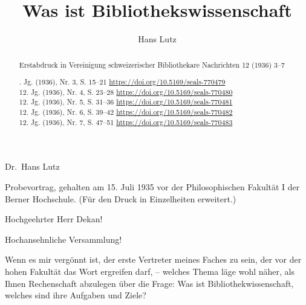 \documentclass[a4paper,
fontsize=11pt,
oneside,
numbers=noperiodatend,
parskip=half-,
bibliography=totoc,
final
]{scrartcl}
\title{\LARGE{Was ist Bibliothekswissenschaft}}%
\author{Hans Lutz} %
\date{}
\begin{document}
\maketitle
\thispagestyle{fancyplain} 

\begin{abstract}
\noindent Erstabdruck in Vereinigung schweizerischer Bibliothekare Nachrichten 12
(1936) 3--7

. Jg. (1936), Nr. 3, S. 15--21
\url{https://doi.org/10.5169/seals-770479}\\
12. Jg. (1936), Nr. 4, S. 23--28
\url{https://doi.org/10.5169/seals-770480}\\
12. Jg. (1936), Nr. 5, S. 31--36
\url{https://doi.org/10.5169/seals-770481}\\
12. Jg. (1936), Nr. 6, S. 39--42
\url{https://doi.org/10.5169/seals-770482}\\
12. Jg. (1936), Nr. 7, S. 47--51
\url{https://doi.org/10.5169/seals-770483}
\end{abstract}


\vspace*{1em}

Dr.~Hans Lutz

Probevortrag, gehalten am 15. Juli 1935 vor der Philosophischen Fakultät
I der Berner Hochschule. (Für den Druck in Einzelheiten erweitert.)

\vspace*{1em}

Hochgeehrter Herr Dekan!

Hochansehnliche Versammlung!

Wenn es mir vergönnt ist, der erste Vertreter meines Faches zu sein, der
vor der hohen Fakultät das Wort ergreifen darf, -- welches Thema läge
wohl näher, als Ihnen Rechenschaft abzulegen über die Frage: Was ist
Bibliothekwissenschaft, welches sind ihre Aufgaben und Ziele?
\end{document}

